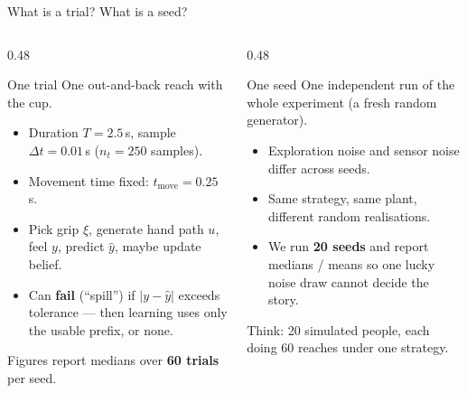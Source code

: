 \documentclass[aspectratio=169, 11pt]{beamer}
\begin{document}
\begin{frame}{What is a trial? What is a seed?}
\begin{columns}[T]
\begin{column}{0.48\linewidth}
\begin{block}{One trial}
One out-and-back reach with the cup.
\vspace{4pt}
\begin{itemize}
  \item Duration $T=2.5$\,s, sample $\Delta t=0.01$\,s
        ($n_t=250$ samples).
  \item Movement time fixed: $t_{\mathrm{move}}=0.25$\,s.
  \item Pick grip $\xi$, generate hand path $u$,
        feel $y$, predict $\hat y$, maybe update belief.
  \item Can \textbf{fail} (``spill'') if
        $|y-\hat y|$ exceeds tolerance --- then learning
        uses only the usable prefix, or none.
\end{itemize}
\vspace{4pt}
{\footnotesize Figures report medians over \textbf{60 trials}
per seed.}
\end{block}
\end{column}
\begin{column}{0.48\linewidth}
\begin{block}{One seed}
One independent run of the whole experiment
(a fresh random generator).
\vspace{4pt}
\begin{itemize}
  \item Exploration noise and sensor noise differ
        across seeds.
  \item Same strategy, same plant, different
        random realisations.
  \item We run \textbf{20 seeds} and report
        medians / means so one lucky noise draw
        cannot decide the story.
\end{itemize}
\vspace{4pt}
{\footnotesize Think: 20 simulated people, each doing
60 reaches under one strategy.}
\end{block}
\end{column}
\end{columns}
\end{frame}
\end{document}
